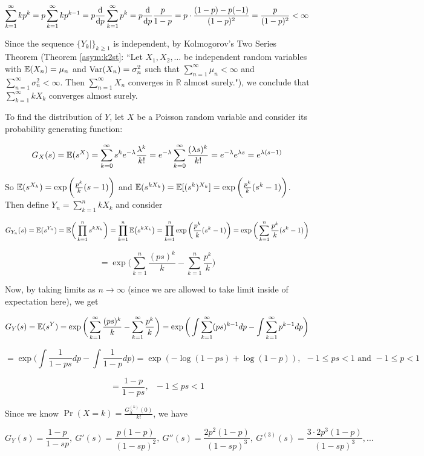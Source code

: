 \begin{enumerate}[(1)]
\[
\sum_{k=1}^\infty k p^k= p\sum_{k=1}^\infty k p^{k-1} = p \frac{\mathrm{d} }{\mathrm{d} p}\sum_{k=1}^\infty  p^k = p \frac{\mathrm{d} }{\mathrm{d} p}\frac{p}{1-p}= p \cdot \frac{(1-p) - p(-1)}{(1-p)^2} = \frac{p}{(1-p)^2} < \infty
\]

Since the sequence \(\{Y_k|\}_{k \geq 1}\) is independent, by Kolmogorov's Two Series Theorem (Theorem \ref{asym:k2st}: ``Let \(X_1, X_2, \ldots\) be independent random variables with \(\mathbb{E}(X_n) = \mu_n\) and \(\mathrm{Var}(X_n) = \sigma_n^2\) such that \(\sum_{n=1}^\infty \mu_n < \infty\) and \(\sum_{n=1}^\infty \sigma_n^2 < \infty\). Then \(\sum_{n=1}^\infty X_n\) converges in \(\mathbb{R}\) almost surely."), we conclude that \(\sum_{k=1}^\infty k X_k\) converges almost surely. 

To find the distribution of \(Y\), let \(X\) be a Poisson random variable and consider its probability generating function:

\[
G_X(s) = \mathbb{E}(s^X) = \sum_{k=0}^\infty s^k e^{- \lambda} \frac{\lambda^k}{k!} = e^{-\lambda} \sum_{k=0}^\infty \frac{(\lambda s)^k}{k!} = e^{-\lambda}e^{\lambda s} = e^{\lambda(s-1)}
\]

So \(\mathbb{E}(s^{X_k}) = \exp \bigg( \frac{p^k}{k}(s-1) \bigg)\) and \(\mathbb{E}(s^{kX_k}) = \mathbb{E}[(s^k)^{X_k}] = \exp\bigg( \frac{p^k}{k}(s^k - 1) \bigg)\). Then define \(Y_n = \sum_{k=1}^n k X_k\) and consider

\[
G_{Y_n}(s) = \mathbb{E}(s^{Y_n}) = \mathbb{E}\bigg( \prod_{k=1}^n s^{kX_k}\bigg) = \prod_{k=1}^n\mathbb{E}\big(  s^{kX_k}\big) = \prod_{k=1}^n \exp \bigg( \frac{p^k}{k} (s^k - 1)\bigg) = \exp \bigg( \sum_{k=1}^n  \frac{p^k}{k} (s^k - 1)\bigg) 
\]

\[
= \exp \bigg( \sum_{k=1}^n  \frac{(ps)^k}{k} -  \sum_{k=1}^n  \frac{p^k}{k} \bigg)
\]

Now, by taking limits as \(n \to \infty\) (since we are allowed to take limit inside of expectation here), we get

\[
G_Y(s) = \mathbb{E}(s^Y) = \exp \bigg( \sum_{k=1}^\infty  \frac{(ps)^k}{k} -  \sum_{k=1}^\infty  \frac{p^k}{k} \bigg) = \exp \bigg( \int \sum_{k=1}^\infty (ps)^{k-1} dp -  \int \sum_{k=1}^\infty  p^{k-1} dp \bigg) 
\]

\[
= \exp \bigg( \int \frac{1}{1-ps} dp-  \int \frac{1}{1-p} dp \bigg) = \exp (-\log(1 - ps) + \log(1 - p)), \ \ -1 \leq ps < 1 \text{ and } -1 \leq p < 1
\]

\[
 = \frac{1 - p}{1 - ps}, \ \ \ -1 \leq ps < 1
\]

Since we know \(\Pr(X =k) = \frac{G_X^{(k)}(0)}{k!} \), we have

\[
G_Y(s) = \frac{1-p}{1 -sp}, \ G'(s) = \frac{p(1-p)}{(1-sp)^2}, \ G''(s) = \frac{2p^2(1-p)}{(1-sp)^3}, \ G^{(3)}(s) = \frac{3 \cdot 2p^3(1-p)}{(1 - sp)^3}, \ldots
\]


\end{enumerate}
